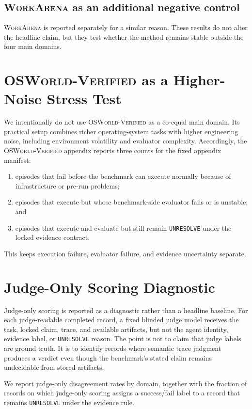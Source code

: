 \documentclass{article}
\newcommand{\workarena}{\textsc{WorkArena}\xspace}
\newcommand{\osworld}{\textsc{OSWorld-Verified}\xspace}
\begin{document}
\subsection{\workarena as an additional negative control}

\workarena is reported separately for a similar reason. These results do not
alter the headline claim, but they test whether the method remains stable
outside the four main domains.

\section{\osworld as a Higher-Noise Stress Test}
\label{app:osworld}

We intentionally do not use \osworld as a co-equal main domain. Its practical
setup combines richer operating-system tasks with higher engineering noise,
including environment volatility and evaluator complexity. Accordingly, the
\osworld appendix reports three counts for the fixed appendix manifest:
\begin{enumerate}
\item episodes that fail before the benchmark can execute normally because of
infrastructure or pre-run problems;
\item episodes that execute but whose benchmark-side evaluator fails or is
unstable; and
\item episodes that execute and evaluate but still remain \texttt{UNRESOLVE}
under the locked evidence contract.
\end{enumerate}
This keeps execution failure, evaluator failure, and evidence uncertainty
separate.

\section{Judge-Only Scoring Diagnostic}
\label{app:judge}

Judge-only scoring is reported as a diagnostic rather than a headline baseline.
For each judge-readable completed record, a fixed blinded judge model receives
the task, locked claim, trace, and available artifacts, but not the agent
identity, evidence label, or \texttt{UNRESOLVE} reason. The point is not to
claim that judge labels are ground truth. It is to identify records where
semantic trace judgment produces a verdict even though the benchmark's stated
claim remains undecidable from stored artifacts.

We report judge-only disagreement rates by domain, together with the fraction
of records on which judge-only scoring assigns a success/fail label to a record
that remains \texttt{UNRESOLVE} under the evidence rule.
\end{document}
